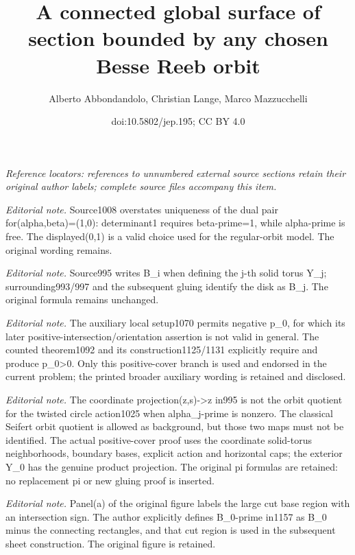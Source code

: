 \documentclass[10pt,a4paper]{amsart}
\title{A connected global surface of section bounded by any chosen Besse Reeb orbit}
\author{Alberto Abbondandolo, Christian Lange, Marco Mazzucchelli}
\date{doi:10.5802/jep.195; CC BY 4.0}
\numberwithin{equation}{section}
\theoremstyle{definition}
\begin{document}
\noindent\textit{Reference locators: references to unnumbered external source sections retain their original author labels; complete source files accompany this item.}\par
\maketitle
\noindent\textit{Editorial note.} Source1008 overstates uniqueness of the dual pair for(alpha,beta)=(1,0): determinant1 requires beta-prime=1, while alpha-prime is free. The displayed(0,1) is a valid choice used for the regular-orbit model. The original wording remains.\par\medskip
\noindent\textit{Editorial note.} Source995 writes B\_i when defining the j-th solid torus Y\_j; surrounding993/997 and the subsequent gluing identify the disk as B\_j. The original formula remains unchanged.\par\medskip
\noindent\textit{Editorial note.} The auxiliary local setup1070 permits negative p\_0, for which its later positive-intersection/orientation assertion is not valid in general. The counted theorem1092 and its construction1125/1131 explicitly require and produce p\_0>0. Only this positive-cover branch is used and endorsed in the current problem; the printed broader auxiliary wording is retained and disclosed.\par\medskip
\noindent\textit{Editorial note.} The coordinate projection(z,s)->z in995 is not the orbit quotient for the twisted circle action1025 when alpha\_j-prime is nonzero. The classical Seifert orbit quotient is allowed as background, but those two maps must not be identified. The actual positive-cover proof uses the coordinate solid-torus neighborhoods, boundary bases, explicit action and horizontal caps; the exterior Y\_0 has the genuine product projection. The original pi formulas are retained: no replacement pi or new gluing proof is inserted.\par\medskip
\noindent\textit{Editorial note.} Panel(a) of the original figure labels the large cut base region with an intersection sign. The author explicitly defines B\_0-prime in1157 as B\_0 minus the connecting rectangles, and that cut region is used in the subsequent sheet construction. The original figure is retained.\par\medskip
\end{document}
